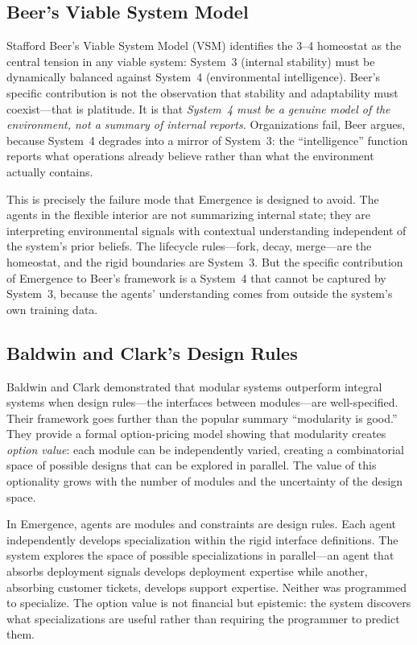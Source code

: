 \documentclass[11pt,twocolumn]{article}
\begin{document}
\subsection{Beer's Viable System Model}

Stafford Beer's Viable System Model (VSM) \citep{beer1972brain}
identifies the 3--4 homeostat as the central tension in any viable
system: System~3 (internal stability) must be dynamically balanced
against System~4 (environmental intelligence).  Beer's specific
contribution is not the observation that stability and adaptability
must coexist---that is platitude.  It is that \emph{System~4 must be a
genuine model of the environment, not a summary of internal reports.}
Organizations fail, Beer argues, because System~4 degrades into a
mirror of System~3: the ``intelligence'' function reports what
operations already believe rather than what the environment actually
contains.

This is precisely the failure mode that Emergence is designed to avoid.
The agents in the flexible interior are not summarizing internal state;
they are interpreting environmental signals with contextual understanding
independent of the system's prior beliefs.  The lifecycle
rules---fork, decay, merge---are the homeostat, and the rigid
boundaries are System~3.  But the specific contribution of Emergence to
Beer's framework is a System~4 that cannot be captured by System~3,
because the agents' understanding comes from outside the system's own
training data.

\subsection{Baldwin and Clark's Design Rules}

Baldwin and Clark \citep{baldwin2000design} demonstrated that modular
systems outperform integral systems when design rules---the interfaces
between modules---are well-specified.  Their framework goes further than
the popular summary ``modularity is good.''  They provide a formal
option-pricing model showing that modularity creates \emph{option
value}: each module can be independently varied, creating a
combinatorial space of possible designs that can be explored in
parallel.  The value of this optionality grows with the number of
modules and the uncertainty of the design space.

In Emergence, agents are modules and constraints are design rules.  Each
agent independently develops specialization within the rigid interface
definitions.  The system explores the space of possible specializations
in parallel---an agent that absorbs deployment signals develops
deployment expertise while another, absorbing customer tickets, develops
support expertise.  Neither was programmed to specialize.  The option
value is not financial but epistemic: the system discovers what
specializations are useful rather than requiring the programmer to
predict them.
\end{document}

